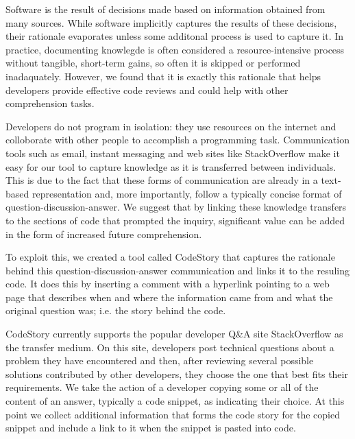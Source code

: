 \documentclass[../manifest.tex]{subfiles}
\begin{document}
Software is the result of decisions made based on information obtained from many sources. While software implicitly captures the results of these decisions, their rationale evaporates unless some additonal process is used to capture it. In practice, documenting knowlegde is often considered a resource-intensive process without tangible, short-term gains, so often it is skipped or performed inadaquately\cite{OZ2008,NH2007}. However, we found that it is exactly this rationale that helps developers provide effective code reviews and could help with other comprehension tasks.

Developers do not program in isolation: they use resources on the internet and colloborate with other people to accomplish a programming task. Communication tools such as email, instant messaging and web sites like StackOverflow make it easy for our tool to capture knowledge as it is transferred between individuals. This is due to the fact that these forms of communication are already in a text-based representation and, more importantly, follow a typically concise format of question-discussion-answer. We suggest that by linking these knowledge transfers to the sections of code that prompted the inquiry, significant value can be added in the form of increased future comprehension.

To exploit this, we created a tool called CodeStory that captures the rationale behind this question-discussion-answer communication and links it to the resuling code. It does this by inserting a comment with a hyperlink pointing to a web page that describes when and where the information came from and what the original question was; i.e. the story behind the code.

CodeStory currently supports the popular developer Q\&A site StackOverflow as the transfer medium. On this site, developers post technical questions about a problem they have encountered and then, after reviewing several possible solutions contributed by other developers, they choose the one that best fits their requirements. We take the action of a developer copying some or all of the content of an answer, typically a code snippet, as indicating their choice. At this point we collect additional information that forms the code story for the copied snippet and include a link to it when the snippet is pasted into code.
\end{document}
